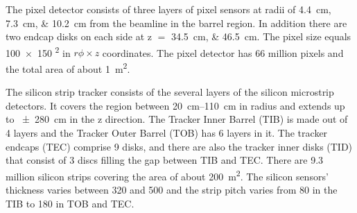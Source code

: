 The pixel detector consists of three layers of pixel sensors at radii of \SIlist{4.4;7.3;10.2}{\cm} from the beamline in
the barrel region. In addition there are two endcap disks on each side at \abs z $=$ \SIlist{34.5;46.5}{\cm}. The pixel
size equals \num{100x150} \si{\micron\squared} in $r \phi \times z$ coordinates. The pixel detector has 66 million
pixels and the total area of about \SI{1}{\m\squared}.

The silicon strip tracker consists of the several layers of the silicon microstrip detectors. It covers the region
between \SIrange{20}{110}{\cm} in radius and extends up to \SI{+-280}{\cm} in the z direction. The Tracker Inner Barrel
(TIB) is made out of 4 layers and the Tracker Outer Barrel (TOB) has 6 layers in it. The tracker endcaps (TEC) comprise
9 disks, and there are also the tracker inner disks (TID) that consist of 3 discs filling the gap between TIB and TEC.
There are \num{9.3} million silicon strips covering the area of about \SI{200}{\m\squared}. The silicon sensors'
thickness varies between \num{320} and \SI{500}{\micron} and the strip pitch varies from \SI{80}{\micron} in the TIB to
\SI{180}{\micron} in TOB and TEC.

